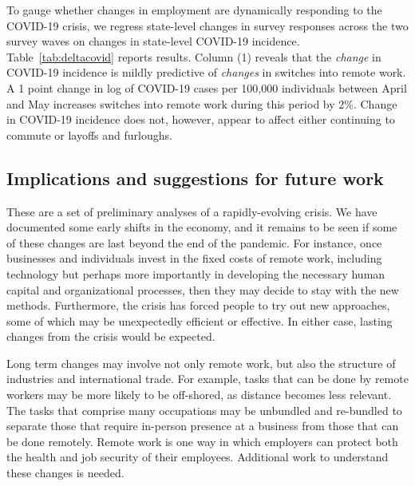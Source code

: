 \documentclass[12pt]{article}
\begin{document}
To gauge whether changes in employment are dynamically responding to the COVID-19 crisis, we regress state-level changes in survey responses across the two survey waves on changes in state-level COVID-19 incidence. Table~\ref{tab:deltacovid} reports results. Column (1) reveals that the \textit{change} in COVID-19 incidence is mildly predictive of \textit{changes} in switches into remote work. A 1 point change in log of COVID-19 cases per 100,000 individuals between April and May increases switches into remote work during this period by 2\%. Change in COVID-19 incidence does not, however, appear to affect either continuing to commute or layoffs and furloughs.





\subsection{Implications and suggestions for future work}
These are a set of preliminary analyses of a rapidly-evolving crisis. We have documented some early shifts in the economy, and it remains to be seen if some of these changes are last beyond the end of the pandemic. For instance, once businesses and individuals invest in the fixed costs of remote work, including technology but perhaps more importantly in developing the necessary human capital and organizational processes, then they may decide to stay with the new methods.  
Furthermore, the crisis has forced people to try out new approaches, some of which may be unexpectedly efficient or effective.  In either case, lasting changes from the crisis would be expected.  

Long term changes may involve not only remote work, but also the structure of industries and international trade. For example, tasks that can be done by remote workers may be more likely to be off-shored, as distance becomes less relevant. The tasks that comprise many occupations may be unbundled and re-bundled to separate those that require in-person presence at a business from those that can be done remotely. Remote work is one way in which employers can protect both the health and job security of their employees. Additional work to understand these changes is needed. 

\end{document}

